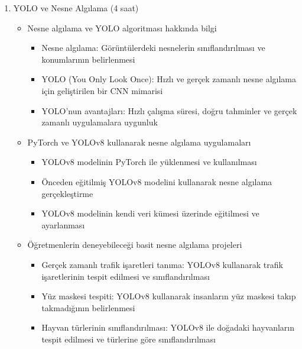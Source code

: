 \documentclass[12pt]{article}
\begin{document}
\begin{enumerate}
    
    \item YOLO ve Nesne Algılama (4 saat)
    \begin{itemize}
        \item Nesne algılama ve YOLO algoritması hakkında bilgi
        \begin{itemize}
            \item Nesne algılama: Görüntülerdeki nesnelerin sınıflandırılması ve konumlarının belirlenmesi
            \item YOLO (You Only Look Once): Hızlı ve gerçek zamanlı nesne algılama için geliştirilen bir CNN mimarisi
            \item YOLO'nun avantajları: Hızlı çalışma süresi, doğru tahminler ve gerçek zamanlı uygulamalara uygunluk
        \end{itemize}
        \item PyTorch ve YOLOv8 kullanarak nesne algılama uygulamaları
        \begin{itemize}
            \item YOLOv8 modelinin PyTorch ile yüklenmesi ve kullanılması
            \item Önceden eğitilmiş YOLOv8 modelini kullanarak nesne algılama gerçekleştirme
            \item YOLOv8 modelinin kendi veri kümesi üzerinde eğitilmesi ve ayarlanması
        \end{itemize}
        \item Öğretmenlerin deneyebileceği basit nesne algılama projeleri
        \begin{itemize}
            \item Gerçek zamanlı trafik işaretleri tanıma: YOLOv8 kullanarak trafik işaretlerinin tespit edilmesi ve sınıflandırılması
            \item Yüz maskesi tespiti: YOLOv8 kullanarak insanların yüz maskesi takıp takmadığının belirlenmesi
            \item Hayvan türlerinin sınıflandırılması: YOLOv8 ile doğadaki hayvanların tespit edilmesi ve türlerine göre sınıflandırılması
        \end{itemize}
    \end{itemize}


\end{enumerate}
\end{document}
